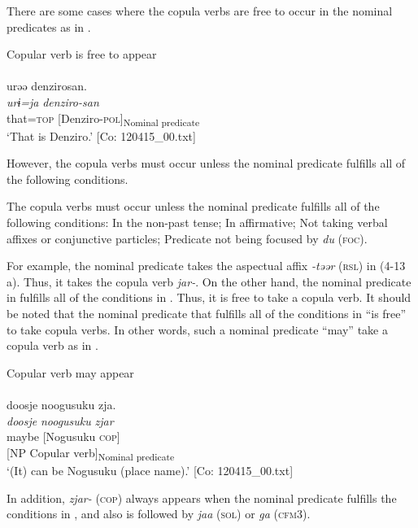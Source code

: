 There are some cases where the copula verbs are free to occur in the nominal predicates as in .

\ea  Copular verb is free to appear \label{ex:4.14}\\\\
\glll    urəə  denzirosan.\\
    \textit{urɨ=ja}  \textit{denziro-san}\\
    that=\textsc{top}  [Denziro-\textsc{pol}]\textsubscript{Nominal predicate}\\
    \glt     ‘That is Denziro.’ [Co: 120415\_00.txt]
\z

However, the copula verbs must occur unless the nominal predicate fulfills all of the following conditions.

\ea  The copula verbs must occur unless the nominal predicate fulfills all of the following conditions: \label{ex:4.15}
  \ea  In the non-past tense;
  \ex  In affirmative;
  \ex  Not taking verbal affixes or conjunctive particles;
  \ex  Predicate not being focused by \textit{du} (\textsc{foc}).
  \z
\z

For example, the nominal predicate takes the aspectual affix \textit{{}-təər} (\textsc{rsl}) in (4-13 a). Thus, it takes the copula verb \textit{jar-}. On the other hand, the nominal predicate in  fulfills all of the conditions in . Thus, it is free to take a copula verb. It should be noted that the nominal predicate that fulfills all of the conditions in  “is free” to take copula verbs. In other words, such a nominal predicate “may” take a copula verb as in .

\ea  Copular verb may appear \label{ex:4.16}\\\\
\gllll    doosje  noogusuku  zja. {}\\
    \textit{doosje}  \textit{noogusuku}  \textit{zjar}\\
    maybe  [Nogusuku  \textsc{cop}]\\
      {} [NP  Copular verb]\textsubscript{Nominal predicate}\\
    \glt     ‘(It) can be Nogusuku (place name).’ [Co: 120415\_00.txt]
\z

  In addition, \textit{zjar-} (\textsc{cop}) always appears when the nominal predicate fulfills the conditions in , and also is followed by \textit{jaa} (\textsc{sol}) or \textit{ga} (\textsc{cfm}3).

